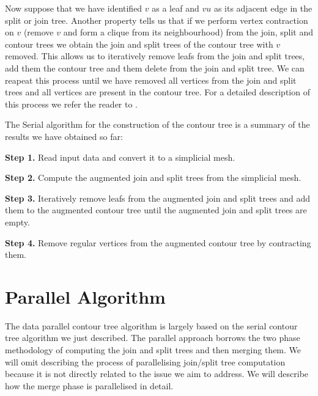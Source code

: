 
Now suppose that we have identified $v$ as a leaf and $vu$ as its adjacent edge in the split or join tree. Another property \cite{carr-masters} tells us that if we perform vertex contraction on $v$ (remove $v$ and form a clique from its neighbourhood) from the join, split and contour trees we obtain the join and split trees of the contour tree with $v$ removed. This allows us to iteratively remove leafs from the join and split trees, add them the contour tree and them delete from the join and split tree. We can reapeat this process until we have removed all vertices from the join and split trees and all vertices are present in the contour tree. For a detailed description of this process we refer the reader to \cite{ct-big-paper}.


The Serial algorithm for the construction of the contour tree is a summary of the results we have obtained so far:

\textbf{Step 1.} Read input data and convert it to a simplicial mesh.

\textbf{Step 2.} Compute the augmented join and split trees from the simplicial mesh.

\textbf{Step 3.} Iteratively remove leafs from the augmented join and split trees and add them to the augmented contour tree until the augmented join and split trees are empty.

\textbf{Step 4.} Remove regular vertices from the augmented contour tree by contracting them.

\section{Parallel Algorithm}

The data parallel contour tree algorithm \cite{parallel-peak-pruning} is largely based on the serial contour tree algorithm we just described. The parallel approach borrows the two phase methodology of computing the join and split trees and then merging them. We will omit describing the process of parallelising join/split tree computation because it is not directly related to the issue we aim to address. We will describe how the merge phase is parallelised in detail.

